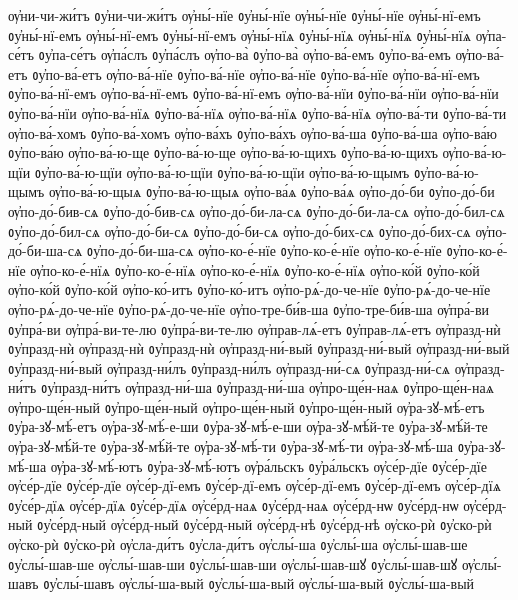 {ѹ҆ни-чи-жи́тъ
ᲂу҆ни-чи-жи́тъ
ѹ҆ны́-нїе
ᲂу҆ны́-нїе
ѹ҆ны́-нїе
ᲂу҆ны́-нїе
ѹ҆ны́-нї-емъ
ᲂу҆ны́-нї-емъ
ѹ҆ны́-нї-емъ
ᲂу҆ны́-нї-емъ
ѹ҆ны́-нїѧ
ᲂу҆ны́-нїѧ
ѹ҆ны́-нїѧ
ᲂу҆ны́-нїѧ
ѹ҆па-се́тъ
ᲂу҆па-се́тъ
ѹ҆па́слъ
ᲂу҆па́слъ
ѹ҆по-ва̀
ᲂу҆по-ва̀
ѹ҆по-ва́-емъ
ᲂу҆по-ва́-емъ
ѹ҆по-ва́-етъ
ᲂу҆по-ва́-етъ
ѹ҆по-ва́-нїе
ᲂу҆по-ва́-нїе
ѹ҆по-ва́-нїе
ᲂу҆по-ва́-нїе
ѹ҆по-ва́-нї-емъ
ᲂу҆по-ва́-нї-емъ
ѹ҆по-ва́-нї-емъ
ᲂу҆по-ва́-нї-емъ
ѹ҆по-ва́-нїи
ᲂу҆по-ва́-нїи
ѹ҆по-ва́-нїи
ᲂу҆по-ва́-нїи
ѹ҆по-ва́-нїѧ
ᲂу҆по-ва́-нїѧ
ѹ҆по-ва́-нїѧ
ᲂу҆по-ва́-нїѧ
ѹ҆по-ва́-ти
ᲂу҆по-ва́-ти
ѹ҆по-ва́-хомъ
ᲂу҆по-ва́-хомъ
ѹ҆по-ва́хъ
ᲂу҆по-ва́хъ
ѹ҆по-ва́-ша
ᲂу҆по-ва́-ша
ѹ҆по-ва́ю
ᲂу҆по-ва́ю
ѹ҆по-ва́-ю-ще
ᲂу҆по-ва́-ю-ще
ѹ҆по-ва́-ю-щихъ
ᲂу҆по-ва́-ю-щихъ
ѹ҆по-ва́-ю-щїи
ᲂу҆по-ва́-ю-щїи
ѹ҆по-ва́-ю-щїи
ᲂу҆по-ва́-ю-щїи
ѹ҆по-ва́-ю-щымъ
ᲂу҆по-ва́-ю-щымъ
ѹ҆по-ва́-ю-щыѧ
ᲂу҆по-ва́-ю-щыѧ
ѹ҆по-ва́ѧ
ᲂу҆по-ва́ѧ
ѹ҆по-до́-би
ᲂу҆по-до́-би
ѹ҆по-до́-бив-сѧ
ᲂу҆по-до́-бив-сѧ
ѹ҆по-до́-би-ла-сѧ
ᲂу҆по-до́-би-ла-сѧ
ѹ҆по-до́-бил-сѧ
ᲂу҆по-до́-бил-сѧ
ѹ҆по-до́-би-сѧ
ᲂу҆по-до́-би-сѧ
ѹ҆по-до́-бих-сѧ
ᲂу҆по-до́-бих-сѧ
ѹ҆по-до́-би-ша-сѧ
ᲂу҆по-до́-би-ша-сѧ
ѹ҆по-ко-е́-нїе
ᲂу҆по-ко-е́-нїе
ѹ҆по-ко-е́-нїе
ᲂу҆по-ко-е́-нїе
ѹ҆по-ко-е́-нїѧ
ᲂу҆по-ко-е́-нїѧ
ѹ҆по-ко-е́-нїѧ
ᲂу҆по-ко-е́-нїѧ
ѹ҆по-ко́й
ᲂу҆по-ко́й
ѹ҆по-ко́й
ᲂу҆по-ко́й
ѹ҆по-ко́-итъ
ᲂу҆по-ко́-итъ
ѹ҆по-рѧ́-до-че-нїе
ᲂу҆по-рѧ́-до-че-нїе
ѹ҆по-рѧ́-до-че-нїе
ᲂу҆по-рѧ́-до-че-нїе
ѹ҆по-тре-би́в-ша
ᲂу҆по-тре-би́в-ша
ѹ҆пра́-ви
ᲂу҆пра́-ви
ѹ҆пра́-ви-те-лю
ᲂу҆пра́-ви-те-лю
ѹ҆прав-лѧ́-етъ
ᲂу҆прав-лѧ́-етъ
ѹ҆празд-нѝ
ᲂу҆празд-нѝ
ѹ҆празд-нѝ
ᲂу҆празд-нѝ
ѹ҆празд-ни́-вый
ᲂу҆празд-ни́-вый
ѹ҆празд-ни́-вый
ᲂу҆празд-ни́-вый
ѹ҆празд-ни́лъ
ᲂу҆празд-ни́лъ
ѹ҆празд-ни́-сѧ
ᲂу҆празд-ни́-сѧ
ѹ҆празд-ни́тъ
ᲂу҆празд-ни́тъ
ѹ҆празд-ни́-ша
ᲂу҆празд-ни́-ша
ѹ҆про-ще́н-наѧ
ᲂу҆про-ще́н-наѧ
ѹ҆про-ще́н-ный
ᲂу҆про-ще́н-ный
ѹ҆про-ще́н-ный
ᲂу҆про-ще́н-ный
ѹ҆ра-зꙋ-мѣ́-етъ
ᲂу҆ра-зꙋ-мѣ́-етъ
ѹ҆ра-зꙋ-мѣ́-е-ши
ᲂу҆ра-зꙋ-мѣ́-е-ши
ѹ҆ра-зꙋ-мѣ́й-те
ᲂу҆ра-зꙋ-мѣ́й-те
ѹ҆ра-зꙋ-мѣ́й-те
ᲂу҆ра-зꙋ-мѣ́й-те
ѹ҆ра-зꙋ-мѣ́-ти
ᲂу҆ра-зꙋ-мѣ́-ти
ѹ҆ра-зꙋ-мѣ́-ша
ᲂу҆ра-зꙋ-мѣ́-ша
ѹ҆ра-зꙋ-мѣ́-ютъ
ᲂу҆ра-зꙋ-мѣ́-ютъ
ѹ҆ра́льскъ
ᲂу҆ра́льскъ
ѹ҆се́р-дїе
ᲂу҆се́р-дїе
ѹ҆се́р-дїе
ᲂу҆се́р-дїе
ѹ҆се́р-дї-емъ
ᲂу҆се́р-дї-емъ
ѹ҆се́р-дї-емъ
ᲂу҆се́р-дї-емъ
ѹ҆се́р-дїѧ
ᲂу҆се́р-дїѧ
ѹ҆се́р-дїѧ
ᲂу҆се́р-дїѧ
ѹ҆се́рд-наѧ
ᲂу҆се́рд-наѧ
ѹ҆се́рд-нѡ
ᲂу҆се́рд-нѡ
ѹ҆се́рд-ный
ᲂу҆се́рд-ный
ѹ҆се́рд-ный
ᲂу҆се́рд-ный
ѹ҆се́рд-нѣ
ᲂу҆се́рд-нѣ
ѹ҆ско-рѝ
ᲂу҆ско-рѝ
ѹ҆ско-рѝ
ᲂу҆ско-рѝ
ѹ҆сла-ди́тъ
ᲂу҆сла-ди́тъ
ѹ҆слы́-ша
ᲂу҆слы́-ша
ѹ҆слы́-шав-ше
ᲂу҆слы́-шав-ше
ѹ҆слы́-шав-ши
ᲂу҆слы́-шав-ши
ѹ҆слы́-шав-шꙋ
ᲂу҆слы́-шав-шꙋ
ѹ҆слы́-шавъ
ᲂу҆слы́-шавъ
ѹ҆слы́-ша-вый
ᲂу҆слы́-ша-вый
ѹ҆слы́-ша-вый
ᲂу҆слы́-ша-вый
}
